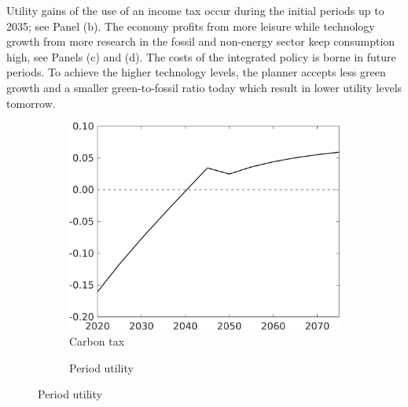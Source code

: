 Utility gains of the use of an income tax occur during the initial periods up to 2035; see Panel (b). 
The economy profits from more leisure while technology growth from more research in the fossil and non-energy sector keep consumption high, see Panels (c) and (d). 
The costs of the integrated policy is borne in future periods. To achieve the higher technology levels, the planner accepts less green growth and a smaller green-to-fossil ratio today which result in lower utility levels tomorrow. %
\begin{figure}[h!!!]
	\centering
	\caption{Deviation from optimal policy with only a carbon tax}\label{fig:opt_TLs}
	\begin{subfigure}{0.4\textwidth}
		\caption{ Carbon tax}
		\includegraphics[width=1\textwidth]{../../codding_model/own_basedOnFried/optimalPol_010922_revision/figures/all_13Sept22_Tplus30/Tauf_OPT_COMPtaulPer_regime4_spillover0_knspil0_noskill0_sep0_xgrowth0_PV1_etaa0.79.png}
	\end{subfigure}
	\begin{subfigure}{0.4\textwidth}
	\caption{Period utility}

\end{subfigure}
\end{figure}
